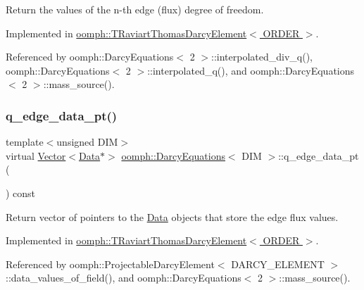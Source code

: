 Return the values of the n-\/th edge (flux) degree of freedom. 



Implemented in \hyperlink{classoomph_1_1TRaviartThomasDarcyElement_a822218aa30be662198873b8b73a0c03c}{oomph\+::\+T\+Raviart\+Thomas\+Darcy\+Element$<$ O\+R\+D\+E\+R $>$}.



Referenced by oomph\+::\+Darcy\+Equations$<$ 2 $>$\+::interpolated\+\_\+div\+\_\+q(), oomph\+::\+Darcy\+Equations$<$ 2 $>$\+::interpolated\+\_\+q(), and oomph\+::\+Darcy\+Equations$<$ 2 $>$\+::mass\+\_\+source().

\mbox{\label{classoomph_1_1DarcyEquations_acc843eea2fff3da96cd213afbff0f6e3}} 
\subsubsection{\texorpdfstring{q\+\_\+edge\+\_\+data\+\_\+pt()}{q\_edge\_data\_pt()}}
{\footnotesize\ttfamily template$<$unsigned D\+IM$>$ \\
virtual \hyperlink{classoomph_1_1Vector}{Vector}$<$\hyperlink{classoomph_1_1Data}{Data}$\ast$$>$ \hyperlink{classoomph_1_1DarcyEquations}{oomph\+::\+Darcy\+Equations}$<$ D\+IM $>$\+::q\+\_\+edge\+\_\+data\+\_\+pt (\begin{DoxyParamCaption}{ }\end{DoxyParamCaption}) const\hspace{0.3cm}{\ttfamily [pure virtual]}}



Return vector of pointers to the \hyperlink{classoomph_1_1Data}{Data} objects that store the edge flux values. 



Implemented in \hyperlink{classoomph_1_1TRaviartThomasDarcyElement_ac58734e7ac988c4eabc80f3352d613a6}{oomph\+::\+T\+Raviart\+Thomas\+Darcy\+Element$<$ O\+R\+D\+E\+R $>$}.



Referenced by oomph\+::\+Projectable\+Darcy\+Element$<$ D\+A\+R\+C\+Y\+\_\+\+E\+L\+E\+M\+E\+N\+T $>$\+::data\+\_\+values\+\_\+of\+\_\+field(), and oomph\+::\+Darcy\+Equations$<$ 2 $>$\+::mass\+\_\+source().

